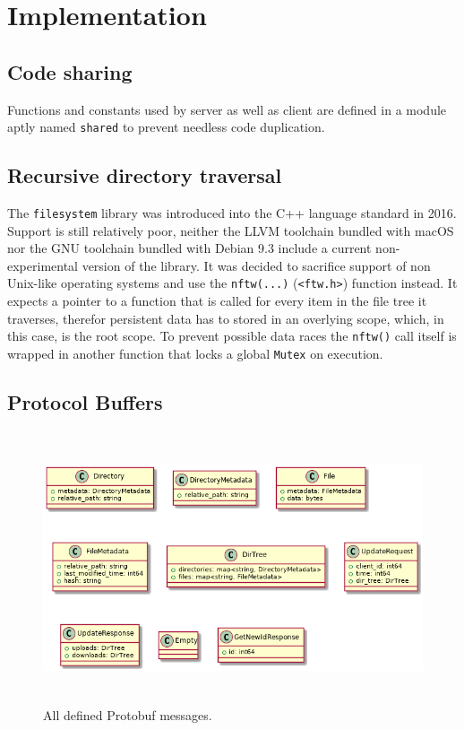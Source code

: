 \documentclass[a4paper]{article}
\begin{document}
\section{Implementation}
\subsection{Code sharing}
Functions and constants used by server as well as client are defined in a module aptly named \texttt{shared} to prevent needless code duplication. 

\subsection{Recursive directory traversal}
The \texttt{filesystem} library was introduced into the C++ language standard in 2016. Support is still relatively poor, neither the LLVM toolchain bundled with macOS nor the GNU toolchain bundled with Debian 9.3 include a current non-experimental version of the library. 
It was decided to sacrifice support of non Unix-like operating systems and use the \texttt{nftw(...)} (\texttt{<ftw.h>}) function instead. It expects a pointer to a function that is called for every item in the file tree it traverses, therefor persistent data has to stored in an overlying scope, which, in this case, is the root scope. To prevent possible data races the \texttt{nftw()} call itself is wrapped in another function that locks a global \texttt{Mutex} on execution.

\subsection{Protocol Buffers}
\begin{figure}[H]
\centering
\includegraphics[height=8cm]{protobufs}
\caption{All defined Protobuf messages.}
\end{figure}
\end{document}
